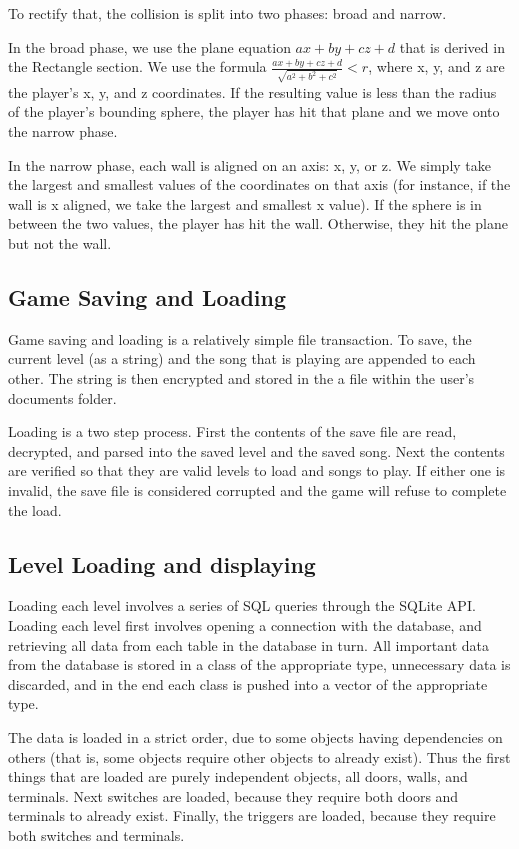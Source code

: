 \documentclass{article}
\begin{document}
To rectify that, the collision is split into two phases: broad and narrow.

In the broad phase, we use the plane equation $ax + by + cz + d$ that is derived in the Rectangle section. We use the formula $\frac{ax + by + cz + d}{\sqrt{a^2 + b^2 + c^2}} < r$, where x, y, and z are the player's x, y, and z coordinates. If the resulting value is less than the radius of the player's bounding sphere, the player has hit that plane and we move onto the narrow phase.

In the narrow phase, each wall is aligned on an axis: x, y, or z. We simply take the largest and smallest values of the coordinates on that axis (for instance, if the wall is x aligned, we take the largest and smallest x value). If the sphere is in between the two values, the player has hit the wall. Otherwise, they hit the plane but not the wall.

\subsection{Game Saving and Loading}
Game saving and loading is a relatively simple file transaction. To save, the current level (as a string) and the song that is playing are appended to each other. The string is then encrypted and stored in the a file within the user's documents folder.

Loading is a two step process. First the contents of the save file are read, decrypted, and parsed into the saved level and the saved song. Next the contents are verified so that they are valid levels to load and songs to play. If either one is invalid, the save file is considered corrupted and the game will refuse to complete the load.

\subsection{Level Loading and displaying}
Loading each level involves a series of SQL queries through the SQLite API. Loading each level first involves opening a connection with the database, and retrieving all data from each table in the database in turn. All important data from the database is stored in a class of the appropriate type, unnecessary data is discarded, and in the end each class is pushed into a vector of the appropriate type. 

The data is loaded in a strict order, due to some objects having dependencies on others (that is, some objects require other objects to already exist). Thus the first things that are loaded are purely independent objects, all doors, walls, and terminals. Next switches are loaded, because they require both doors and terminals to already exist. Finally, the triggers are loaded, because they require both switches and terminals.
\end{document}
